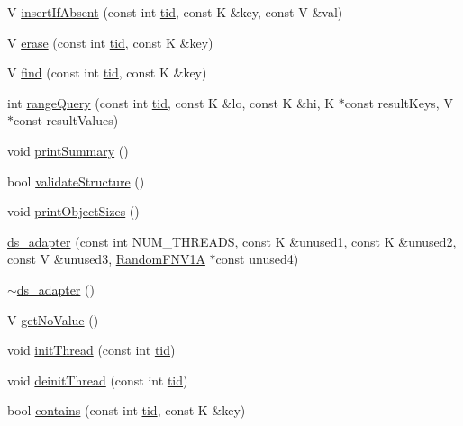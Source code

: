 \begin{DoxyCompactItemize}
\item 
V \hyperlink{classds__adapter_ae9cb29ad0c0338c0e1d12ef97e008135}{insert\+If\+Absent} (const int \hyperlink{microbench_2main_8cpp_a9ca9869868fe7e7a38a921cc7de4103f}{tid}, const K \&key, const V \&val)
\item 
V \hyperlink{classds__adapter_a1bf459e8449df93cc738a644aeffdcfb}{erase} (const int \hyperlink{microbench_2main_8cpp_a9ca9869868fe7e7a38a921cc7de4103f}{tid}, const K \&key)
\item 
V \hyperlink{classds__adapter_a0109b0d011810f687c9e9273eb1d1bc8}{find} (const int \hyperlink{microbench_2main_8cpp_a9ca9869868fe7e7a38a921cc7de4103f}{tid}, const K \&key)
\item 
int \hyperlink{classds__adapter_a23a9c8db5425e98a93d647df1c6c23dd}{range\+Query} (const int \hyperlink{microbench_2main_8cpp_a9ca9869868fe7e7a38a921cc7de4103f}{tid}, const K \&lo, const K \&hi, K $\ast$const result\+Keys, V $\ast$const result\+Values)
\item 
void \hyperlink{classds__adapter_aac97293215557665d2ef1e1a0d06fcfd}{print\+Summary} ()
\item 
bool \hyperlink{classds__adapter_ae50fe8a8683c0278cdd4c45e1405860d}{validate\+Structure} ()
\item 
void \hyperlink{classds__adapter_a33b13b7059a8c0345fb59a324dc3a691}{print\+Object\+Sizes} ()
\item 
\hyperlink{classds__adapter_ab37964787a66459a325cf75ac91da4e8}{ds\+\_\+adapter} (const int N\+U\+M\+\_\+\+T\+H\+R\+E\+A\+DS, const K \&unused1, const K \&unused2, const V \&unused3, \hyperlink{classRandomFNV1A}{Random\+F\+N\+V1A} $\ast$const unused4)
\item 
\hyperlink{classds__adapter_a366f46dd39d59f2d4a147589f5fd98e3}{$\sim$ds\+\_\+adapter} ()
\item 
V \hyperlink{classds__adapter_a9e1e4aec136b351d1a6820d70484a6c5}{get\+No\+Value} ()
\item 
void \hyperlink{classds__adapter_a3733f6a6b57312b1b5e4fb5181d82a0b}{init\+Thread} (const int \hyperlink{microbench_2main_8cpp_a9ca9869868fe7e7a38a921cc7de4103f}{tid})
\item 
void \hyperlink{classds__adapter_a173ca48b19fc1dc346159ea582c690cd}{deinit\+Thread} (const int \hyperlink{microbench_2main_8cpp_a9ca9869868fe7e7a38a921cc7de4103f}{tid})
\item 
bool \hyperlink{classds__adapter_aecf1899dbe9fae93c72ee2b5549cf6eb}{contains} (const int \hyperlink{microbench_2main_8cpp_a9ca9869868fe7e7a38a921cc7de4103f}{tid}, const K \&key)

\end{DoxyCompactItemize}

